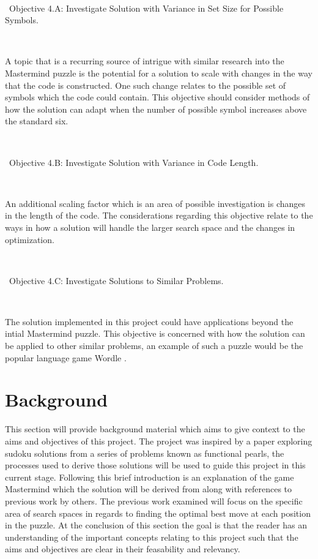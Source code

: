 \documentclass[12pt]{article}  %
\theoremstyle{definition}
\theoremstyle{remark}
\begin{document}
\

\textbullet\ Objective 4.A: Investigate Solution with Variance in Set Size for Possible Symbols.

\

A topic that is a recurring source of intrigue with similar research into the Mastermind puzzle is the potential for a solution to scale with 
changes in the way that the code is constructed. One such change relates to the possible set of symbols which the code could contain. 
This objective should consider methods of how the solution can adapt when the number of possible symbol increases above the standard six.

\

\textbullet\ Objective 4.B: Investigate Solution with Variance in Code Length.

\

An additional scaling factor which is an area of possible investigation is changes in the length of the code. 
The considerations regarding this objective relate to the ways in how a solution will handle the larger search space and the changes in optimization.

\

\textbullet\ Objective 4.C: Investigate Solutions to Similar Problems.

\

The solution implemented in this project could have applications beyond the intial Mastermind puzzle. 
This objective is concerned with how the solution can be applied to other similar problems, an example of such a puzzle would be the popular language game Wordle \cite{Wordle}.

%

\newpage                     %
\section{Background}\label{ss:back}

This section will provide background material which aims to give context to the aims and objectives of this project. 
The project was inspired by a paper exploring sudoku solutions from a series of problems known as functional pearls, 
the processes used to derive those solutions will be used to guide this project in this current stage. 
Following this brief introduction is an explanation of the game Mastermind which the solution will be derived from along 
with references to previous work by others. The previous work examined will focus on the specific area of search spaces 
in regards to finding the optimal best move at each position in the puzzle. At the conclusion of this section the goal is 
that the reader has an understanding of the important concepts relating to this project such that the aims and objectives
are clear in their feasability and relevancy.
\end{document}
